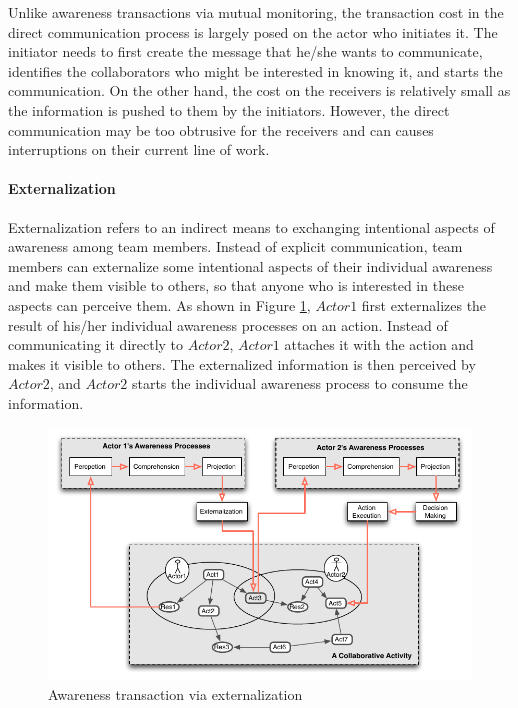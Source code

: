 Unlike awareness transactions via mutual monitoring, the transaction cost in the direct communication process is largely posed on the actor who initiates it. The initiator needs to first create the message that he/she wants to communicate, identifies the collaborators who might be interested in knowing it, and starts the communication. On the other hand, the cost on the receivers is relatively small as the information is pushed to them by the initiators. However, the direct communication may be too obtrusive for the receivers and can causes interruptions on their current line of work.

\paragraph*{Externalization} %
\label{par:externalization}
Externalization refers to an indirect means to exchanging intentional aspects of awareness among team members. Instead of explicit communication, team members can externalize some intentional aspects of their individual awareness and make them visible to others, so that anyone who is interested in these aspects can perceive them. As shown in Figure \ref{fig:trans_externalization}, $Actor1$ first externalizes the result of his/her individual awareness processes on an action. Instead of communicating it directly to $Actor2$, $Actor1$ attaches it with the action and makes it visible to others. The externalized information is then perceived by $Actor2$, and $Actor2$ starts the individual awareness process to consume the information.

\begin{figure}[htbp] %
   \centering
   \includegraphics{trans_externalization.pdf} 
   \caption{Awareness transaction via externalization}
   \label{fig:trans_externalization}
\end{figure}

